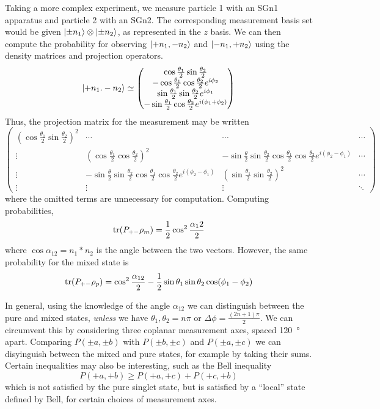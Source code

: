 Taking a more complex experiment, we measure particle 1 with an SGn1 apparatus and particle 2 with an SGn2. The corresponding measurement basis set would be given \(\lvert\pm n_1\rangle\otimes\lvert\pm n_2\rangle\), as represented in the \(z\) basis. We can then compute the probability for observing \(\lvert+n_1,-n_2\rangle\) and \(\lvert-n_1, +n_2\rangle\) using the density matrices and projection operators.
\[\lvert+n_1.-n_2\rangle\simeq \begin{pmatrix}
	\cos\frac{\theta_1}{2}\sin\frac{\theta_2}{2}\\
	-\cos\frac{\theta_1}{2}\cos\frac{\theta_2}{2}e^{i\phi_2}\\
	\sin\frac{\theta_1}{2}\sin\frac{\theta_2}{2}e^{i\phi_1}\\
	-\sin\frac{\theta_1}{2}\cos\frac{\theta_2}{2}e^{i(\phi_1+\phi_2)}
\end{pmatrix}\]
Thus, the projection matrix for the measurement may be written
\[\begin{pmatrix}
	\left(\cos\frac{\theta_1}{2}\sin\frac{\theta_2}{2}\right)^2 & \cdots & \cdots & \cdots \\
	\vdots & \left(\cos\frac{\theta_1}{2}\cos\frac{\theta_2}{2}\right)^2 & -\sin\frac{\theta}{2}\sin\frac{\theta_2}{2}\cos\frac{\theta_1}{2}\cos\frac{\theta_2}{2}e^{i(\phi_2-\phi_1)} & \cdots \\
	\vdots &-\sin\frac{\theta}{2}\sin\frac{\theta_2}{2}\cos\frac{\theta_1}{2}\cos\frac{\theta_2}{2}e^{i(\phi_2-\phi_1)} & \left(\sin\frac{\theta_1}{2}\sin\frac{\theta_2}{2}\right)^2& \cdots \\
		\vdots &\vdots & \vdots & \ddots
\end{pmatrix}\]
where the omitted terms are unnecessary for computation. Computing probabilities,
\[\operatorname{tr}(P_{+-}\rho_m)=\frac{1}{2}\cos^2\frac{\alpha_12}{2}\]
where \(\cos\alpha_{12} = n_1*n_2\) is the angle between the two vectors. However, the same probability for the mixed state is
\[\operatorname{tr}(P_{+-}\rho_p)=\cos^2\frac{\alpha_{12}}{2}-\frac{1}{2}\sin\theta_1\sin\theta_2\cos(\phi_1-\phi_2)\]

In general, using the knowledge of the angle \(\alpha_{12}\) we can distinguish between the pure and mixed states, \emph{unless} we have \(\theta_1,\theta_2=n\pi\) or \(\Delta\phi = \frac{(2n+1)\pi}{2}\). We can circumvent this by considering three coplanar measurement axes, spaced \SI{120}{\degree} apart. Comparing \(P(\pm a,\pm b)\) with \(P(\pm b,\pm c)\) and \(P(\pm a, \pm c)\) we can disyinguish between the mixed and pure states, for example by taking their sums. Certain inequalities may also be interesting, such as the Bell inequality
\begin{equation}
	P(+a,+b) \geq P(+a,+c) + P(+c,+b)
\end{equation}
which is not satisfied by the pure singlet state, but is satisfied by a ``local'' state defined by Bell, for certain choices of measurement axes.
